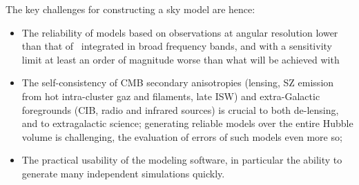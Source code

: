 The key challenges for constructing a sky model are hence:
\begin{itemize} 
\item The reliability of models based on observations at angular resolution lower than that of \cmbexp\, integrated in broad frequency bands, and with a sensitivity limit at least an order of magnitude worse than what will be achieved with \cmbexp\;%
\item The self-consistency of CMB secondary anisotropies (lensing, SZ emission from hot intra-cluster gaz and filaments, late ISW) and extra-Galactic foregrounds (CIB, radio and infrared sources) is crucial to both de-lensing, and to extragalactic science; generating reliable models over the entire Hubble volume is challenging, the evaluation of errors of such models even more so;
\item The practical usability of the modeling software, in particular the ability to generate many independent simulations quickly.
\end{itemize} 


%


